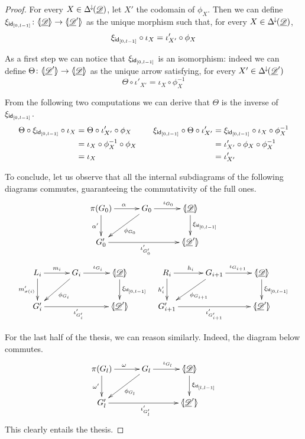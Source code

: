 \begin{proof}
	For every $X\in \Delta^{\hspace{-1pt}\downarrow\hspace{-1pt}}(\underline{\mathscr{D}}) $, let $X'$ the codomain of $\phi_X$. Then we can define $\xi_{\mathsf{id}_{[0,l-1]}}\colon \langle \hspace{-1.85pt}[ \underline{\mathscr{D}}]\hspace{-1.85pt}\rangle\to \langle \hspace{-1.85pt}[ \underline{\mathscr{D}}']\hspace{-1.85pt}\rangle$ as the unique morphism such that, for every $X\in \Delta^{\hspace{-1pt}\downarrow\hspace{-1pt}}(\underline{\mathscr{D}})$, 
	\[\xi_{\mathsf{id}_{[0,l-1]}} \circ \iota_{X}= \iota'_{X'}\circ \phi_X\]

As a first step we can notice that $\xi_{\mathsf{id}_{[0,l-1]}}$ is an isomorphism: indeed we can define $\Theta\colon \langle \hspace{-1.85pt}[\underline{\mathscr{D}}']\hspace{-1.85pt}\rangle \to \langle \hspace{-1.85pt}[ \underline{\mathscr{D}}]\hspace{-1.85pt}\rangle$ as the unique arrow satisfying, for every $X'\in \Delta^{\hspace{-1pt}\downarrow\hspace{-1pt}}(\underline{\mathscr{D}}')$
\[\Theta \circ \iota'_{X'}= \iota_{X}\circ \phi^{-1}_X\]

From the following two computations we can derive that $\Theta$ is the inverse of $\xi_{\mathsf{id}_{[0,l-1]}}$.
\[\begin{split}
	\Theta \circ \xi_{\mathsf{id}_{[0,l-1]}}\circ \iota_{X}&=\Theta \circ\iota'_{X'}\circ \phi_X\\&=\iota_{X}\circ \phi^{-1}_X\circ \phi_X\\&=\iota_X 
\end{split}\qquad \begin{split}
\xi_{\mathsf{id}_{[0,l-1]}}\circ \Theta \circ \iota'_{X'}&=\xi_{\mathsf{id}_{[0,l-1]}}\circ \iota_X\circ \phi^{-1}_{X}\\&=\iota'_{X'}\circ \phi_X\circ \phi^{-1}_{X}\\&=\iota'_{X'}
\end{split}\]

To conclude, let us observe that all the internal subdiagrams of the following diagrams commutes, guaranteeing the commutativity of the full ones.
\[\xymatrix@C=30pt{\pi(G_0)\ar[r]^{\alpha} \ar[d]_{\alpha'} & G_0 \ar[dl]^{\phi_{G_0}} \ar[r]^{\iota_{G_0}} &\tpro{D} \ar[d]^{\xi_{\id{[0, l-1]}}}\\ G'_0 \ar[rr]_{\iota'_{G'_0}} & &\lpro \der{D}' \rpro}\]
\[\xymatrix@C=30pt{L_i \ar[r]^{m_i} \ar[d]_{m'_{\sigma(i)}}& G_i \ar[dl]^{\phi_{G_i}} \ar[r]^{\iota_{G_i}} &\tpro{D} \ar[d]^{\xi_{\id{[0, l-1]}}} & R_i \ar[r]^{h_i} \ar[d]_{h'_{i}}& G_{i+1} \ar[dl]^{\phi_{G_{i+1}}}\ar[r]^{\iota_{G_{i+1}}} &\tpro{D} \ar[d]^{\xi_{\id{[0, l-1]}}} \\G'_{i} \ar[rr]_{\iota'_{G'_{i}}}&& \lpro \der{D}' \rpro& G'_{i+1} \ar[rr]_{\iota'_{G'_{i+1}}}&& \lpro \der{D}' \rpro}\]

For the last half of the thesis, we can reason similarly. Indeed, the diagram below commutes.
\[\xymatrix@C=30pt{\pi(G_l)\ar[r]^{\omega} \ar[d]_{\omega'} & G_l \ar[dl]^{\phi_{G_l}} \ar[r]^{\iota_{G_l}} &\tpro{D} \ar[d]^{\xi_{\id{[l, l-1]}}}\\ G'_l \ar[rr]_{\iota'_{G'_l}} & &\lpro \der{D}' \rpro}\]
This clearly entails the thesis.
\end{proof}

